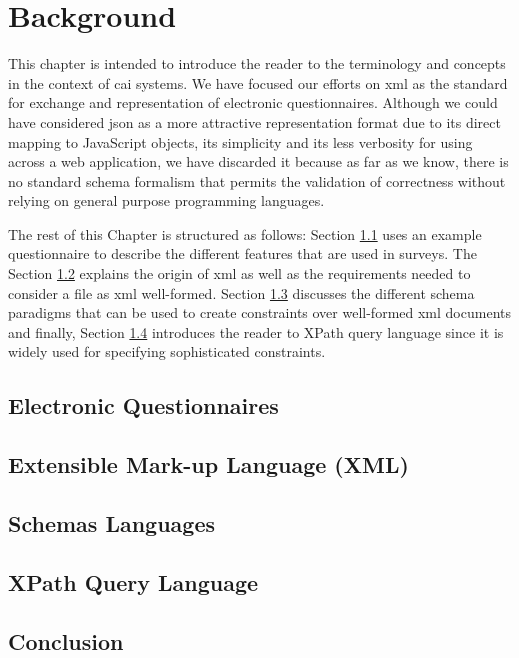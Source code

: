 \chapter{Background}\label{ch:background}
	This chapter is intended to introduce the reader to the terminology and concepts in the context of \gls{cai} systems. We have focused our efforts on \gls{xml} as the standard for exchange and representation of electronic questionnaires. Although we could have considered \gls{json} as a more attractive representation format due to its direct mapping to JavaScript objects, its simplicity and its less verbosity for using across a web application, we have discarded it because as far as we know, there is no standard schema formalism that permits the validation of correctness without relying on general purpose programming languages.

	The rest of this Chapter is structured as follows: Section \ref{sec:background:questionnaires} uses an example questionnaire to describe the different features that are used in surveys. The Section \ref{sec:background:xml} explains the origin of \gls{xml} as well as the requirements needed to consider a file as \gls{xml} well-formed. Section \ref{sec:background:xmlSchemas} discusses the different schema paradigms that can be used to create constraints over well-formed \gls{xml} documents and finally, Section \ref{sec:background:xPath} introduces the reader to XPath query language since it is widely used for specifying sophisticated constraints.

\section{Electronic Questionnaires}\label{sec:background:questionnaires}
	
\section{Extensible Mark-up Language (XML)}\label{sec:background:xml}
	
\section{Schemas Languages}\label{sec:background:xmlSchemas}
	
\section{XPath Query Language}\label{sec:background:xPath}
	
\section{Conclusion}
	


